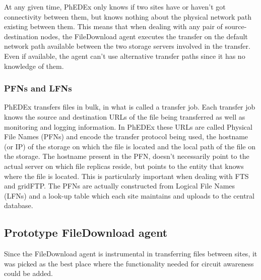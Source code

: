 At any given time, PhEDEx only knows if two sites have or haven't got connectivity
between them, but knows nothing about the physical network path existing between
them. This means that when dealing with any pair of source-destination nodes, 
the FileDownload agent executes the transfer on the default network path available 
between the two storage servers involved in the transfer. Even if available, the agent
 can't use alternative transfer paths since it has no knowledge of them.

\subsubsection{PFNs and LFNs}

PhEDEx transfers files in bulk, in what is called a transfer job. Each transfer job
knows the source and destination URLs of the file being transferred as well as 
monitoring and logging information. In PhEDEx these URLs are called Physical
File Names (PFNs) and encode the transfer protocol being used, the hostname (or IP)
of the storage on which the file is located and the local path of the file
on the storage. 
The hostname present in the PFN, doesn't necessarily point to the
actual server on which file replicas reside, but points to the entity that knows where 
the file is located. This is particularly important when dealing with FTS and gridFTP.
The PFNs are actually constructed from Logical File Names (LFNs) and a look-up table
which each site maintains and uploads to the central database.

\subsection{Prototype FileDownload agent}

Since the FileDownload agent is instrumental in transferring files between sites, it was 
picked as the best place where the functionality needed for circuit awareness could be added.

